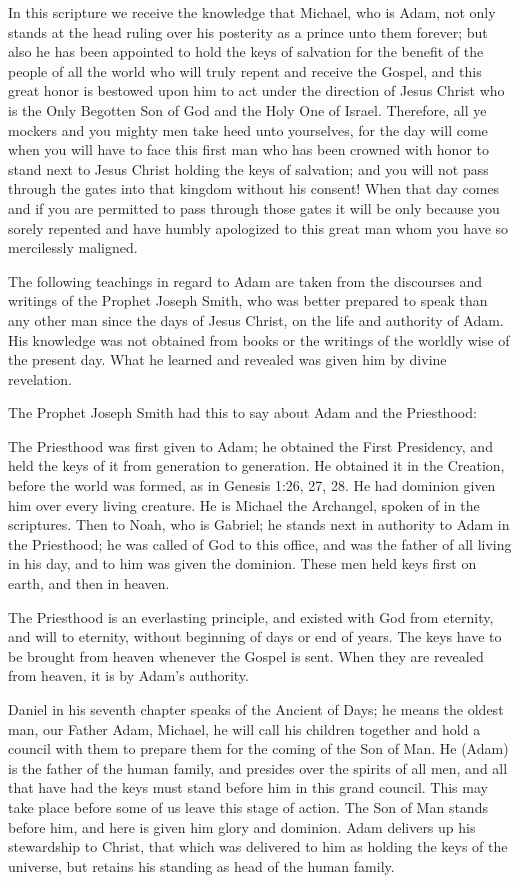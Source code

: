 In this scripture we receive the knowledge that Michael, who is Adam, not only stands at the
head ruling over his posterity as a prince unto them forever; but also he has been appointed to
hold the keys of salvation for the benefit of the people of all the world who will truly repent
and receive the Gospel, and this great honor is bestowed upon him to act under the direction
of Jesus Christ who is the Only Begotten Son of God and the Holy One of Israel. Therefore,
all ye mockers and you mighty men take heed unto yourselves, for the day will come when
you will have to face this first man who has been crowned with honor to stand next to Jesus
Christ holding the keys of salvation; and you will not pass through the gates into that
kingdom without his consent! When that day comes and if you are permitted to pass through
those gates it will be only because you sorely repented and have humbly apologized to this
great man whom you have so mercilessly maligned.

The following teachings in regard to Adam are taken from the discourses and writings of the
Prophet Joseph Smith, who was better prepared to speak than any other man since the days of
Jesus Christ, on the life and authority of Adam. His knowledge was not obtained from books
or the writings of the worldly wise of the present day. What he learned and revealed was
given him by divine revelation.

The Prophet Joseph Smith had this to say about Adam and the Priesthood:

The Priesthood was first given to Adam; he obtained the First Presidency, and held the keys
of it from generation to generation. He obtained it in the Creation, before the world was
formed, as in Genesis 1:26, 27, 28. He had dominion given him over every living creature.
He is Michael the Archangel, spoken of in the scriptures. Then to Noah, who is Gabriel; he
stands next in authority to Adam in the Priesthood; he was called of God to this office, and
was the father of all living in his day, and to him was given the dominion. These men held
keys first on earth, and then in heaven.

The Priesthood is an everlasting principle, and existed with God from eternity, and will to
eternity, without beginning of days or end of years. The keys have to be brought from heaven
whenever the Gospel is sent. When they are revealed from heaven, it is by Adam's authority.

Daniel in his seventh chapter speaks of the Ancient of Days; he means the oldest man, our
Father Adam, Michael, he will call his children together and hold a council with them to
prepare them for the coming of the Son of Man. He (Adam) is the father of the human
family, and presides over the spirits of all men, and all that have had the keys must stand
before him in this grand council. This may take place before some of us leave this stage of
action. The Son of Man stands before him, and here is given him glory and dominion. Adam
delivers up his stewardship to Christ, that which was delivered to him as holding the keys of
the universe, but retains his standing as head of the human family.

